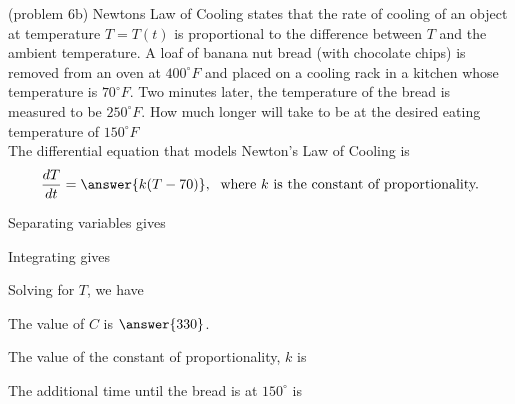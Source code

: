 \documentclass[handout]{ximera}
\begin{document}
\begin{problem}(problem 6b)
Newtons Law of Cooling states that the rate of cooling of an object at temperature $T = T(t)$ is proportional to the difference between $T$
and the ambient temperature. A loaf of banana nut bread (with chocolate chips) is removed from an oven at $400^\circ F$ and placed on a cooling rack
in a kitchen whose temperature is $70^{\circ} F$.  
Two minutes later, the temperature of the bread is measured to be $250^\circ F$.
How much longer will take to be at the desired eating temperature of $150^\circ F$ \\

The differential equation that models Newton's Law of Cooling is
\[
\frac{dT}{dt} = \answer{k(T-70)}, \; \text{ where $k$ is the constant of proportionality.}
\]

Separating variables gives

\begin{multipleChoice}
\end{multipleChoice}


Integrating gives
\begin{multipleChoice}
\end{multipleChoice}


Solving for $T$, we have

\begin{multipleChoice}
\end{multipleChoice}

The value of $C$ is $\answer{330}$.

The value of the constant of proportionality, $k$ is

\begin{multipleChoice}
\end{multipleChoice}



The additional time until the bread is at $150^\circ$ is 

\begin{multipleChoice}
\end{multipleChoice}


\end{problem}
\end{document}
